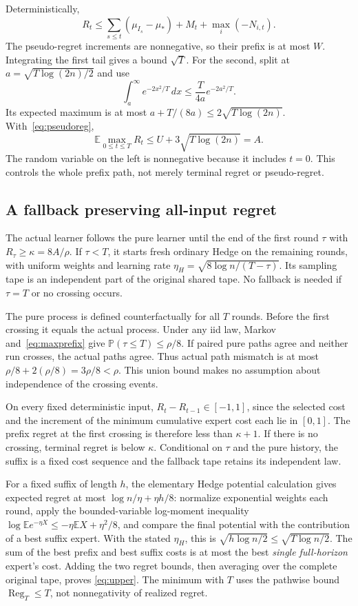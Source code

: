 \documentclass[11pt]{article}
\newcommand{\E}{\mathbb E}
\newcommand{\Prob}{\mathbb P}
\newcommand{\1}{\mathbf 1}
\newcommand{\Reg}{\operatorname{Reg}}
\begin{document}
Deterministically,
\[
 R_t\le\sum_{s\le t}(\mu_{I_s}-\mu_*)+M_t+\max_i(-N_{i,t}).
\]
The pseudo-regret increments are nonnegative, so their prefix is at
most $W$. Integrating the first tail gives a bound $\sqrt T$.
For the second, split at $a=\sqrt{T\log(2n)/2}$ and use
\[
 \int_a^\infty e^{-2x^2/T}\,dx
 \le\frac{T}{4a}e^{-2a^2/T}.
\]
Its expected maximum is at most
$a+T/(8a)\le2\sqrt{T\log(2n)}$. With~\eqref{eq:pseudoreg},
\begin{equation}\label{eq:maxprefix}
 \E\max_{0\le t\le T}R_t\le U+3\sqrt{T\log(2n)}=A.
\end{equation}
The random variable on the left is nonnegative because it includes
$t=0$. This controls the whole prefix path, not merely terminal
regret or pseudo-regret.

\subsection{A fallback preserving all-input regret}

The actual learner follows the pure learner until the end of the first
round $\tau$ with $R_\tau\ge\kappa=8A/\rho$. If $\tau<T$,
it starts fresh ordinary Hedge on the remaining rounds, with uniform
weights and learning rate
$\eta_H=\sqrt{8\log n/(T-\tau)}$. Its sampling tape is an independent
part of the original shared tape. No fallback is needed if $\tau=T$
or no crossing occurs.

The pure process is defined counterfactually for all $T$ rounds.
Before the first crossing it equals the actual process. Under any iid
law, Markov and~\eqref{eq:maxprefix} give
$\Prob(\tau\le T)\le\rho/8$. If paired pure paths agree and neither
run crosses, the actual paths agree. Thus actual path mismatch is at
most $\rho/8+2(\rho/8)=3\rho/8<\rho$.
This union bound makes no assumption about independence of the crossing
events.

On every fixed deterministic input,
$R_t-R_{t-1}\in[-1,1]$, since the selected cost and the increment of
the minimum cumulative expert cost each lie in $[0,1]$.
The prefix regret at the first crossing is therefore less than
$\kappa+1$. If there is no crossing, terminal regret is below $\kappa$.
Conditional on $\tau$ and the pure history, the suffix is a fixed
cost sequence and the fallback tape retains its independent law.

For a fixed suffix of length $h$, the elementary Hedge potential
calculation gives expected regret at most
$\log n/\eta+\eta h/8$: normalize exponential weights each round,
apply the bounded-variable log-moment inequality
$\log\E e^{-\eta X}\le-\eta\E X+\eta^2/8$, and compare the final
potential with the contribution of a best suffix expert.
With the stated $\eta_H$, this is
$\sqrt{h\log n/2}\le\sqrt{T\log n/2}$.
The sum of the best prefix and best suffix costs is at most the
best \emph{single full-horizon} expert's cost. Adding the two regret
bounds, then averaging over the complete original tape, proves
\eqref{eq:upper}. The minimum with $T$ uses the pathwise bound
$\Reg_T\le T$, not nonnegativity of realized regret.
\end{document}
